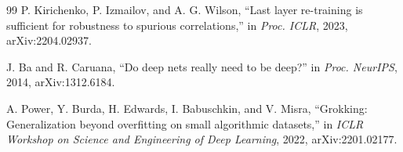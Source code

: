\documentclass[conference]{IEEEtran}
\begin{document}
\begin{thebibliography}{99}
P. Kirichenko, P. Izmailov, and A. G. Wilson, ``Last layer re-training is sufficient for
robustness to spurious correlations,'' in \textit{Proc. ICLR}, 2023, arXiv:2204.02937.

J. Ba and R. Caruana, ``Do deep nets really need to be deep?'' in \textit{Proc. NeurIPS},
2014, arXiv:1312.6184.

A. Power, Y. Burda, H. Edwards, I. Babuschkin, and V. Misra, ``Grokking: Generalization
beyond overfitting on small algorithmic datasets,'' in \textit{ICLR Workshop on Science
and Engineering of Deep Learning}, 2022, arXiv:2201.02177.

\end{thebibliography}
\end{document}
